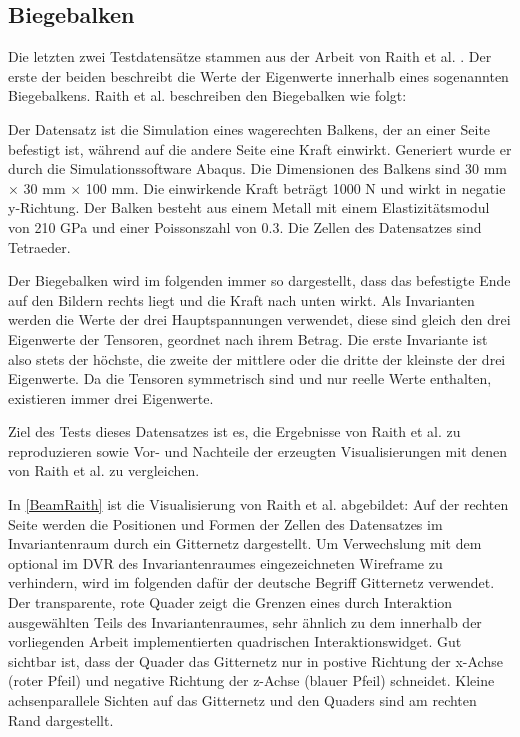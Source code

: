 \documentclass[a4paper,fontsize=12pt,toc=bib,halfparskip,ngerman]{scrartcl}
\begin{document}
\subsection{Biegebalken}
Die letzten zwei Testdatens\"atze stammen aus der Arbeit von Raith et al. \cite{raith2019tensor}. Der erste der beiden beschreibt die Werte der Eigenwerte innerhalb eines sogenannten Biegebalkens. Raith et al. beschreiben den Biegebalken wie folgt\cite[S.~1128]{raith2019tensor}: 

Der Datensatz ist die Simulation eines wagerechten Balkens, der an einer Seite befestigt ist, w\"ahrend auf die andere Seite eine Kraft einwirkt. Generiert wurde er durch die Simulationssoftware Abaqus\cite{abaqusWebsite}. Die Dimensionen des Balkens sind 30 mm $\times$ 30 mm $\times$ 100 mm. Die einwirkende Kraft betr\"agt 1000 N und wirkt in negatie y-Richtung. Der Balken besteht aus einem Metall mit einem Elastizit\"atsmodul von 210 GPa und einer Poissonszahl von 0.3. Die Zellen des Datensatzes sind Tetraeder.

Der Biegebalken wird im folgenden immer so dargestellt, dass das befestigte Ende auf den Bildern rechts liegt und die Kraft nach unten wirkt. Als Invarianten werden die Werte der drei Hauptspannungen verwendet, diese sind gleich den drei Eigenwerte der Tensoren, geordnet nach ihrem Betrag. Die erste Invariante ist also stets der h\"ochste, die zweite der mittlere oder die dritte der kleinste der drei Eigenwerte. Da die Tensoren symmetrisch sind und nur reelle Werte enthalten, existieren immer drei Eigenwerte.

Ziel des Tests dieses Datensatzes ist es, die Ergebnisse von Raith et al. zu reproduzieren sowie Vor- und Nachteile der erzeugten Visualisierungen mit denen von Raith et al. zu vergleichen.

In \cref{BeamRaith} ist die Visualisierung von Raith et al. abgebildet: Auf der rechten Seite werden die Positionen und Formen der Zellen des Datensatzes im Invariantenraum durch ein Gitternetz dargestellt. Um Verwechslung mit dem optional im DVR des Invariantenraumes eingezeichneten Wireframe zu verhindern, wird im folgenden daf\"ur der deutsche Begriff Gitternetz verwendet. Der transparente, rote Quader zeigt die Grenzen eines durch Interaktion ausgew\"ahlten Teils des Invariantenraumes, sehr \"ahnlich zu dem innerhalb der vorliegenden Arbeit implementierten quadrischen Interaktionswidget. Gut sichtbar ist, dass der Quader das Gitternetz nur in postive Richtung der x-Achse (roter Pfeil) und negative Richtung der z-Achse (blauer Pfeil) schneidet. Kleine achsenparallele Sichten auf das Gitternetz und den Quaders sind am rechten Rand dargestellt.
\end{document}
